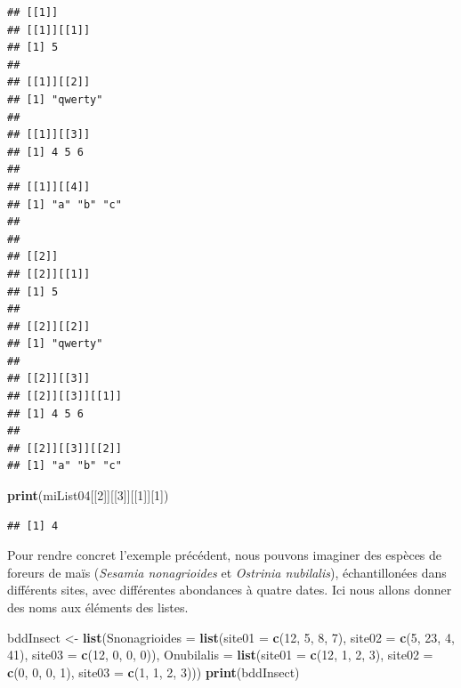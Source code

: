 \documentclass[]{book}
\newenvironment{Shaded}{\begin{snugshade}}{\end{snugshade}}
\newcommand{\DataTypeTok}[1]{\textcolor[rgb]{0.13,0.29,0.53}{#1}}
\newcommand{\DecValTok}[1]{\textcolor[rgb]{0.00,0.00,0.81}{#1}}
\newcommand{\KeywordTok}[1]{\textcolor[rgb]{0.13,0.29,0.53}{\textbf{#1}}}
\newcommand{\NormalTok}[1]{#1}
\newcommand{\StringTok}[1]{\textcolor[rgb]{0.31,0.60,0.02}{#1}}
\begin{document}
\begin{verbatim}
## [[1]]
## [[1]][[1]]
## [1] 5
## 
## [[1]][[2]]
## [1] "qwerty"
## 
## [[1]][[3]]
## [1] 4 5 6
## 
## [[1]][[4]]
## [1] "a" "b" "c"
## 
## 
## [[2]]
## [[2]][[1]]
## [1] 5
## 
## [[2]][[2]]
## [1] "qwerty"
## 
## [[2]][[3]]
## [[2]][[3]][[1]]
## [1] 4 5 6
## 
## [[2]][[3]][[2]]
## [1] "a" "b" "c"
\end{verbatim}

\begin{Shaded}
\begin{Highlighting}[]
\KeywordTok{print}\NormalTok{(miList04[[}\DecValTok{2}\NormalTok{]][[}\DecValTok{3}\NormalTok{]][[}\DecValTok{1}\NormalTok{]][}\DecValTok{1}\NormalTok{])}
\end{Highlighting}
\end{Shaded}

\begin{verbatim}
## [1] 4
\end{verbatim}

Pour rendre concret l'exemple précédent, nous pouvons imaginer des espèces de foreurs de maïs (\emph{Sesamia nonagrioides} et \emph{Ostrinia nubilalis}), échantillonées dans différents sites, avec différentes abondances à quatre dates. Ici nous allons donner des noms aux éléments des listes.

\begin{Shaded}
\begin{Highlighting}[]
\NormalTok{bddInsect <-}\StringTok{ }\KeywordTok{list}\NormalTok{(}\DataTypeTok{Snonagrioides =} \KeywordTok{list}\NormalTok{(}\DataTypeTok{site01 =} \KeywordTok{c}\NormalTok{(}\DecValTok{12}\NormalTok{, }\DecValTok{5}\NormalTok{, }\DecValTok{8}\NormalTok{, }\DecValTok{7}\NormalTok{), }\DataTypeTok{site02 =} \KeywordTok{c}\NormalTok{(}\DecValTok{5}\NormalTok{, }\DecValTok{23}\NormalTok{, }\DecValTok{4}\NormalTok{, }\DecValTok{41}\NormalTok{), }\DataTypeTok{site03 =} \KeywordTok{c}\NormalTok{(}\DecValTok{12}\NormalTok{, }\DecValTok{0}\NormalTok{, }\DecValTok{0}\NormalTok{, }\DecValTok{0}\NormalTok{)), }\DataTypeTok{Onubilalis =} \KeywordTok{list}\NormalTok{(}\DataTypeTok{site01 =} \KeywordTok{c}\NormalTok{(}\DecValTok{12}\NormalTok{, }\DecValTok{1}\NormalTok{, }\DecValTok{2}\NormalTok{, }\DecValTok{3}\NormalTok{), }\DataTypeTok{site02 =} \KeywordTok{c}\NormalTok{(}\DecValTok{0}\NormalTok{, }\DecValTok{0}\NormalTok{, }\DecValTok{0}\NormalTok{, }\DecValTok{1}\NormalTok{), }\DataTypeTok{site03 =} \KeywordTok{c}\NormalTok{(}\DecValTok{1}\NormalTok{, }\DecValTok{1}\NormalTok{, }\DecValTok{2}\NormalTok{, }\DecValTok{3}\NormalTok{)))}
\KeywordTok{print}\NormalTok{(bddInsect)}
\end{Highlighting}
\end{Shaded}
\end{document}
